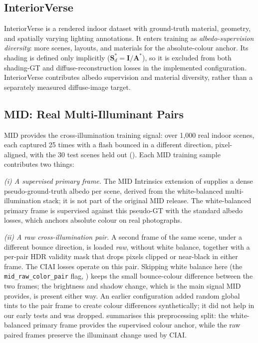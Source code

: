\subsection{InteriorVerse}

InteriorVerse  is a rendered indoor dataset with
ground-truth material, geometry, and spatially varying lighting annotations.
It enters training as \emph{albedo-supervision diversity}: more scenes, layouts,
and materials for the absolute-colour anchor.
Its shading is defined only implicitly ($\mathbf{S}^*_d = \mathbf{I}/\mathbf{A}^*$),
so it is excluded from both shading-GT and diffuse-reconstruction losses in the
implemented configuration. InteriorVerse contributes albedo supervision and
material diversity, rather than a separately measured diffuse-image target.

\subsection{MID: Real Multi-Illuminant Pairs}

MID  provides the cross-illumination training signal: over
1{,}000 real indoor scenes, each captured 25 times with a flash bounced in a
different direction, pixel-aligned, with the 30 test scenes held out
().
Each MID training sample contributes two things:

\emph{(i) A supervised primary frame.}
The MID Intrinsics extension of  supplies a dense
pseudo-ground-truth albedo per scene, derived from the white-balanced
multi-illumination stack; it is not part of the original MID release.
The white-balanced primary frame is supervised against this pseudo-GT with the
standard albedo losses, which anchors absolute colour on real photographs.

\emph{(ii) A raw cross-illumination pair.}
A second frame of the same scene, under a different bounce direction, is loaded
\emph{raw}, without white balance, together with a per-pair HDR validity mask
that drops pixels clipped or near-black in either frame.
The CIAI losses operate on this pair.
Skipping white balance here (the \texttt{mid\_raw\_color\_pair} flag,
) keeps the small bounce-colour difference between the two
frames; the brightness and shadow change, which is the main signal MID provides, is
present either way.
An earlier configuration added random global tints to the pair frame to create colour
differences synthetically; it did not help in our early tests and was dropped.
 summarises this preprocessing split: the
white-balanced primary frame provides the supervised colour anchor, while the raw
paired frames preserve the illuminant change used by CIAI.

